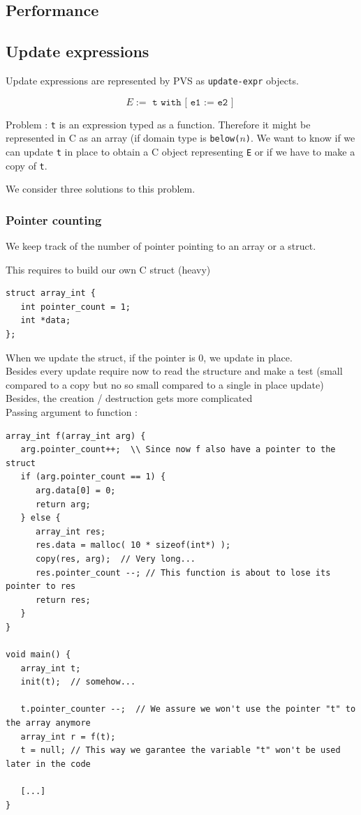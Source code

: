 \documentclass[12pt,a4paper,titlepage]{article}
\newcommand{\cl}[1]{\texttt{#1}}
\begin{document}
\subsection{Performance}

\subsection{Update expressions}
Update expressions are represented by PVS as \texttt{update-expr} objects.

$$ E := \texttt{ t with [ e1 := e2 ] } $$


Problem :
\cl{t} is an expression typed as a function. Therefore it might be represented in C as an array (if domain type is \cl{below($n$)}.
We want to know if we can update \cl{t} in place to obtain a C object representing \cl{E} or if we have to make a copy of \cl{t}.


We consider three solutions to this problem.

\subsubsection{Pointer counting}

We keep track of the number of pointer pointing to an array or a struct.

This requires to build our own C struct (heavy)
\begin{lstlisting}
struct array_int {
   int pointer_count = 1;
   int *data;
};
\end{lstlisting}

When we update the struct, if the pointer is 0, we update in place.\\

Besides every update require now to read the structure and make a test (small compared to a copy but no so small compared to a single in place update)\\

Besides, the creation / destruction gets more complicated\\

Passing argument to function :
\begin{lstlisting}
array_int f(array_int arg) {
   arg.pointer_count++;  \\ Since now f also have a pointer to the struct
   if (arg.pointer_count == 1) {
      arg.data[0] = 0;
      return arg;
   } else {
      array_int res;
      res.data = malloc( 10 * sizeof(int*) );
      copy(res, arg);  // Very long...
      res.pointer_count --; // This function is about to lose its pointer to res
      return res;
   }
}

void main() {
   array_int t;
   init(t);  // somehow...
   
   t.pointer_counter --;  // We assure we won't use the pointer "t" to the array anymore
   array_int r = f(t);
   t = null; // This way we garantee the variable "t" won't be used later in the code
   
   [...]   
}
\end{lstlisting}
\end{document}
